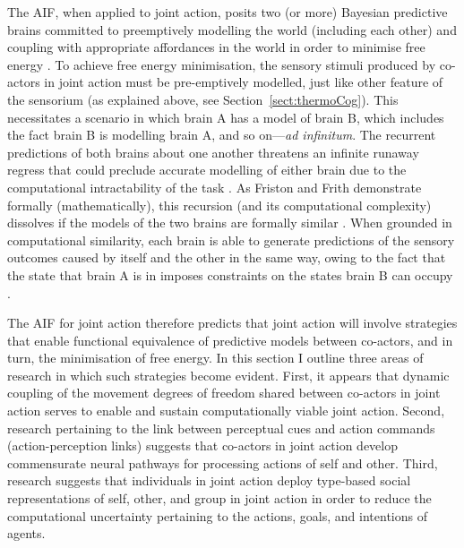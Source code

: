 \begin{CJK}{UTF8}{gbsn}
The AIF, when applied to joint action, posits two (or more) Bayesian predictive brains committed to preemptively modelling the world (including each other) and coupling with appropriate affordances in the world in order to minimise free energy \citep{Moutoussis2014,Friston2015,Friston2015a}.  To achieve free energy minimisation, the sensory stimuli produced by co-actors in joint action must be pre-emptively modelled, just like other feature of the sensorium (as explained above, see Section~\ref{sect:thermoCog}).  This necessitates a scenario in which brain A has a model of brain B, which includes the fact brain B is modelling brain A, and so on---\textit{ad infinitum}.  The recurrent predictions of both brains about one another threatens an infinite runaway regress that could preclude accurate modelling of either brain due to the computational intractability of the task \citep{Moutoussis2014,Friston2015}.  As Friston and Frith demonstrate formally (mathematically), this recursion (and its computational complexity) dissolves if the models of the two brains are formally similar \citep{Friston2015,Friston2015a}.
When grounded in computational similarity, each brain is able to generate predictions of the sensory outcomes caused by itself and the other in the same way, owing to the fact that the state that brain A is in imposes constraints on the states brain B can occupy \citep{Richardson2015}.

The AIF for joint action therefore predicts that joint action will involve strategies that enable functional equivalence of predictive models between co-actors, and in turn, the minimisation of free energy.  In this section I outline three areas of research in which such strategies become evident.  First, it appears that dynamic coupling of the movement degrees of freedom shared between co-actors in joint action serves to enable and sustain computationally viable joint action.  Second, research pertaining to the link between perceptual cues and action commands (action-perception links) suggests that co-actors in joint action develop commensurate neural pathways for processing actions of self and other.  Third, research suggests that individuals in joint action deploy type-based social representations of self, other, and group in joint action in order to reduce the computational uncertainty pertaining to the actions, goals, and intentions of agents.


\end{CJK}
